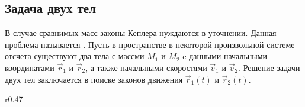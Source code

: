 \subsection{Задача двух тел}
В случае сравнимых масс законы Кеплера нуждаются в уточнении. Данная проблема называется . Пусть в пространстве в некоторой произвольной системе отсчета существуют два тела с массми $M_1$ и $M_2$ c данными начальными координатами $\vec{r}_1$ и $\vec{r}_2$, а также начальными скоростями $\vec{v}_1$ и $\vec{v}_2$. Решение задачи двух тел заключается в поиске законов движения $\vec{r}_1(t)$ и $\vec{r}_2(t)$.

\begin{wrapfigure}[7]{r}{0.47\tw}
    \centering
    \vspace{-1pc}
    \caption{}
    \label{pic:reduced-mass}    
\end{wrapfigure}

